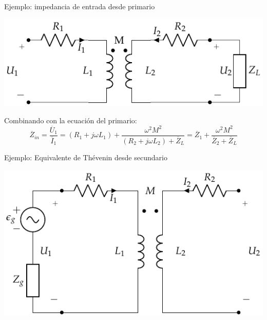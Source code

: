 \documentclass[aspectratio=169, usenames,svgnames,dvipsnames]{beamer}
\begin{document}
\begin{frame}[label={sec:org499014a}]{Ejemplo: impedancia de entrada desde primario}
\begin{center}
\includegraphics[height=0.45\textheight]{../figs/Trafo_Real_ImpSec.pdf}
\end{center}
Combinando con la ecuación del primario:
\[
  \overline{Z}_{in}  = \frac{\overline{U}_1}{\overline{I}_1} =  (R_1 + j \omega L_1) + \frac{\omega^2 M^2}{(R_2 + j \omega L_2) + \overline{Z}_L} = \boxed{\overline{Z}_1 + \frac{\omega^2 M^2}{\overline{Z}_2 + \overline{Z}_L}}
\]
\end{frame}

\begin{frame}[label={sec:org7f969e8}]{Ejemplo: Equivalente de Thévenin desde secundario}
\begin{center}
\includegraphics[height=0.8\textheight]{../figs/Trafo_Real_FuentePrimario.pdf}
\end{center}
\end{frame}
\end{document}
